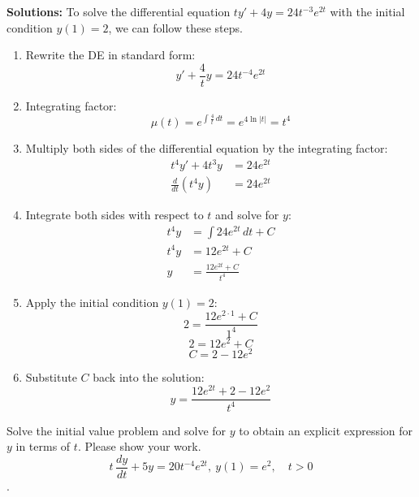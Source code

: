 \ifnum {} {\color{DarkBlue} 
\textbf{Solutions:}
To solve the differential equation \( t y' + 4 y = 24 t^{-3} e^{2t} \) with the initial condition \( y(1) = 2 \), we can follow these steps.
\begin{enumerate}
    \item Rewrite the DE in standard form:
   \[ y' + \frac{4}{t} y = 24 t^{-4} e^{2t} \]
   \item Integrating factor:
   \[ \mu(t) = e^{\int \frac{4}{t} \, dt} = e^{4 \ln |t|} = t^4 \]
   \item Multiply both sides of the differential equation by the integrating factor:
   \begin{align*}
       t^4 y' + 4 t^3 y &= 24 e^{2t} \\
       \frac{d}{dt} (t^4 y) &= 24 e^{2t}
   \end{align*} 
   \item Integrate both sides with respect to \( t \) and solve for $y$:
   \begin{align}
       t^4 y &= \int 24 e^{2t} \, dt + C \\
       t^4 y &= 12 e^{2t} + C \\
        y &= \frac{12 e^{2t} + C}{t^4} 
   \end{align} 
   \item Apply the initial condition \( y(1) = 2 \):
   \[ 2 = \frac{12 e^{2 \cdot 1} + C}{1^4} \]
   \[ 2 = 12 e^2 + C \]
   \[ C = 2 - 12 e^2 \]
   \item Substitute \( C \) back into the solution:
   \[ y = \frac{12 e^{2t} + 2 - 12 e^2}{t^4} \]
\end{enumerate}
} 
\else 
\newpage
\fi
\fi   





\ifnum {}
\question[4] 
Solve the initial value problem and solve for $y$ to obtain an explicit expression for $y$ in terms of $t$. Please show your work.
$$\displaystyle t\,\frac{dy}{dt} + 5y =  20 t^{-4}e^{2t}, \ y(1) = e^2, \quad t > 0$$.

